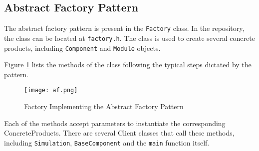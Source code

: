 \subsection{Abstract Factory Pattern}
The abstract factory pattern is present in the \texttt{Factory} class. In the repository, the class can be located at \texttt{factory.h}. The class is used to create several concrete products, including \texttt{Component} and \texttt{Module} objects.

Figure \ref{fig:af} lists the methods of the class following the typical steps dictated by the pattern.

\begin{figure}[h]
    \caption{Factory Implementing the Abstract Factory Pattern}
    \label{fig:af}
    \centering
    \texttt{[image: af.png]}
\end{figure}

Each of the methods accept parameters to instantiate the corresponding ConcreteProducts. There are several Client classes that call these methods, including \texttt{Simulation}, \texttt{BaseComponent} and the \texttt{main} function itself.
